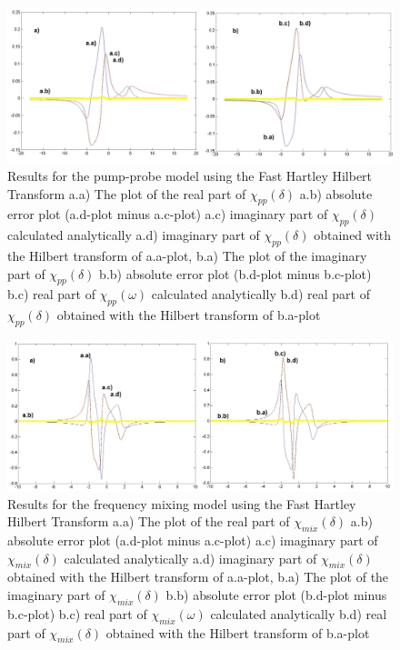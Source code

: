 \documentclass[12pt,twoside,a4paper]{article}
\numberwithin{equation}{subsection}
\numberwithin{figure}{subsection}
\begin{document}
\begin{figure} 
  \includegraphics[width=150mm]{img/fht_pnp.png}
  \caption{Results for the pump-probe model using the Fast Hartley Hilbert Transform
     a.a) The plot of the real part of ${\chi_{pp}}(\delta )$
     a.b) absolute error plot (a.d-plot minus a.c-plot) 
     a.c) imaginary part of ${\chi_{pp}}(\delta )$ calculated analytically 
     a.d) imaginary part of ${\chi_{pp}}(\delta )$ obtained with the Hilbert transform of a.a-plot, 
     b.a) The plot of the imaginary part of ${\chi_{pp}}(\delta )$ 
     b.b) absolute error plot (b.d-plot minus b.c-plot) 
     b.c) real part of $\chi_{pp} (\omega )$ calculated analytically 
     b.d) real part of ${\chi_{pp}}(\delta )$ obtained with the Hilbert transform of b.a-plot 
     \label{fig:fht_pnp}
     }
\end{figure} 

\begin{figure} 
  \includegraphics[width=150mm]{img/fht_fmix.png}
  \caption{Results for the frequency mixing model using the Fast Hartley Hilbert Transform
     a.a) The plot of the real part of ${\chi_{mix}}(\delta )$
     a.b) absolute error plot (a.d-plot minus a.c-plot) 
     a.c) imaginary part of ${\chi_{mix}}(\delta )$ calculated analytically 
     a.d) imaginary part of ${\chi_{mix}}(\delta )$ obtained with the Hilbert transform of a.a-plot, 
     b.a) The plot of the imaginary part of ${\chi_{mix}}(\delta )$ 
     b.b) absolute error plot (b.d-plot minus b.c-plot) 
     b.c) real part of $\chi_{mix} (\omega )$ calculated analytically 
     b.d) real part of ${\chi_{mix}}(\delta )$ obtained with the Hilbert transform of b.a-plot 
     \label{fig:fht_fmix}
     }
\end{figure}
\end{document}
